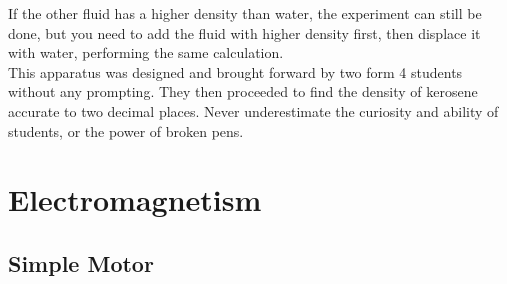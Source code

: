 \begin{itemize}
{If the other fluid has a higher density than water, the experiment can still be done, but you need to add the fluid with higher density first, then displace it with water, performing the same calculation.\\
This apparatus was designed and brought forward by two form 4 students without any prompting. They then proceeded to find the density of kerosene accurate to two decimal places. Never underestimate the curiosity and ability of students, or the power of broken pens.}
\end{itemize}

\section{Electromagnetism}

\subsection{Simple Motor}

